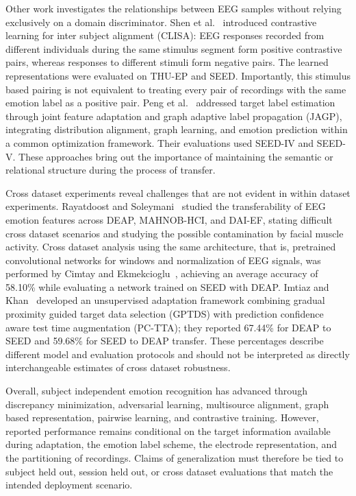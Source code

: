 \documentclass[ASNA,twocolumn]{USG}
\begin{document}
Other work investigates the relationships between EEG samples without relying exclusively on a domain discriminator. Shen et al.~\cite{shen2022contrastive} introduced contrastive learning for inter subject alignment (CLISA): EEG responses recorded from different individuals during the same stimulus segment form positive contrastive pairs, whereas responses to different stimuli form negative pairs. The learned representations were evaluated on THU-EP and SEED. Importantly, this stimulus based pairing is not equivalent to treating every pair of recordings with the same emotion label as a positive pair. Peng et al.~\cite{peng2022joint} addressed target label estimation through joint feature adaptation and graph adaptive label propagation (JAGP), integrating distribution alignment, graph learning, and emotion prediction within a common optimization framework. Their evaluations used SEED-IV and SEED-V. These approaches bring out the importance of maintaining the semantic or relational structure during the process of transfer.

Cross dataset experiments reveal challenges that are not evident in within dataset experiments. Rayatdoost and Soleymani~\cite{rayatdoost2018cross} studied the transferability of EEG emotion features across DEAP, MAHNOB-HCI, and DAI-EF, stating difficult cross dataset scenarios and studying the possible contamination by facial muscle activity. Cross dataset analysis using the same architecture, that is, pretrained convolutional networks for windows and normalization of EEG signals, was performed by Cimtay and Ekmekcioglu~\cite{cimtay2020investigating}, achieving an average accuracy of 58.10\% while evaluating a network trained on SEED with DEAP. Imtiaz and Khan~\cite{imtiaz2025enhanced} developed an unsupervised adaptation framework combining gradual proximity guided target data selection (GPTDS) with prediction confidence aware test time augmentation (PC-TTA); they reported 67.44\% for DEAP to SEED and 59.68\% for SEED to DEAP transfer. These percentages describe different model and evaluation protocols and should not be interpreted as directly interchangeable estimates of cross dataset robustness.

Overall, subject independent emotion recognition has advanced through discrepancy minimization, adversarial learning, multisource alignment, graph based representation, pairwise learning, and contrastive training. However, reported performance remains conditional on the target information available during adaptation, the emotion label scheme, the electrode representation, and the partitioning of recordings. Claims of generalization must therefore be tied to subject held out, session held out, or cross dataset evaluations that match the intended deployment scenario.
\end{document}

